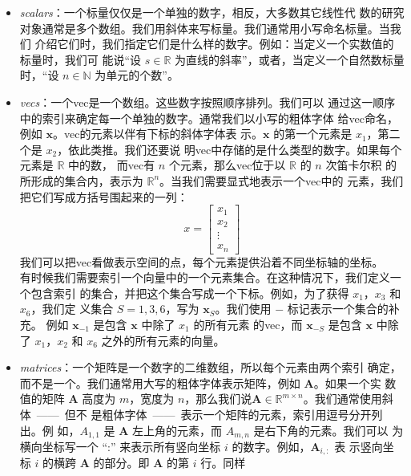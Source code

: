 \begin{itemize}
\item \emph{\gls{scalars}}：一个标量仅仅是一个单独的数字，相反，大多数其它线性代
  数的研究对象通常是多个数组。我们用斜体来写标量。我们通常用小写命名标量。当我们
  介绍它们时，我们指定它们是什么样的数字。例如：当定义一个实数值的标量时，我们可
  能说``设 $s \in \mathbb{R}$ 为直线的斜率''，或者，当定义一个自然数标量
  时，``设 $n \in \mathbb{N}$ 为单元的个数''。
\item \emph{\gls{vecs}}：一个\gls*{vec}是一个数组。这些数字按照顺序排列。我们可以
  通过这一顺序中的索引来确定每一个单独的数字。通常我们以小写的粗体字体
  给\gls*{vec}命名，例如 $\pmb{x}$。\gls*{vec}的元素以伴有下标的斜体字体表
  示。$\pmb{x}$ 的第一个元素是 $x_1$，第二个是 $x_2$，依此类推。我们还要说
  明\gls*{vec}中存储的是什么类型的数字。如果每个元素是 $\mathbb{R}$ 中的数，
  而\gls*{vec}有 $n$ 个元素，那么\gls*{vec}位于以 $\mathbb{R}$ 的 $n$ 次笛卡尔积
  的所形成的集合内，表示为 $\mathbb{R}^n$。当我们需要显式地表示一个\gls*{vec}中的
  元素，我们把它们写成方括号围起来的一列：
  \begin{equation}
    x = \begin{bmatrix}x_1\\ x_2\\ \vdots\\ x_n\end{bmatrix}
    \label{eq:vec_example}
  \end{equation}
  我们可以把\gls*{vec}看做表示空间的点，每个元素提供沿着不同坐标轴的坐标。\\
  有时候我们需要索引一个向量中的一个元素集合。在这种情况下，我们定义一个包含索引
  的集合，并把这个集合写成一个下标。例如，为了获得 $x_1$，$x_3$ 和 $x_6$，我们定
  义集合 $S = {1, 3, 6}$，写为 $\pmb{x}_S$。我们使用 $-$ 标记表示一个集合的补充。
  例如 $\pmb{x}_{-1}$ 是包含 $\pmb{x}$ 中除了 $x_1$ 的所有元素
  的\gls*{vec}，而 $\pmb{x}_{-S}$ 是包含 $\pmb{x}$ 中除了 $x_1$，$x_2$ 和 $x_6$
  之外的所有元素的向量。
\item \emph{\gls{matrices}}：一个矩阵是一个数字的二维数组，所以每个元素由两个索引
  确定，而不是一个。我们通常用大写的粗体字体表示矩阵，例如 $\pmb{A}$。如果一个实
  数值的矩阵 $\pmb{A}$ 高度为 $m$，宽度为
  $n$，那么我们说$\pmb{A} \in \mathbb{R}^{m \times n}$。我们通常使用斜体~——~但不
  是粗体字体~——~表示一个矩阵的元素，索引用逗号分开列出。例
  如，$A_{1,1}$ 是 $\pmb{A}$ 左上角的元素，而 $A_{m,n}$ 是右下角的元素。我们可以
  为横向坐标写一个 ``:'' 来表示所有竖向坐标 $i$ 的数字。例如，$\pmb{A}_{i,:}$ 表
  示竖向坐标 $i$ 的横跨 $\pmb{A}$ 的部分。即 $\pmb{A}$ 的第 $i$ 行。同样

\end{itemize}
